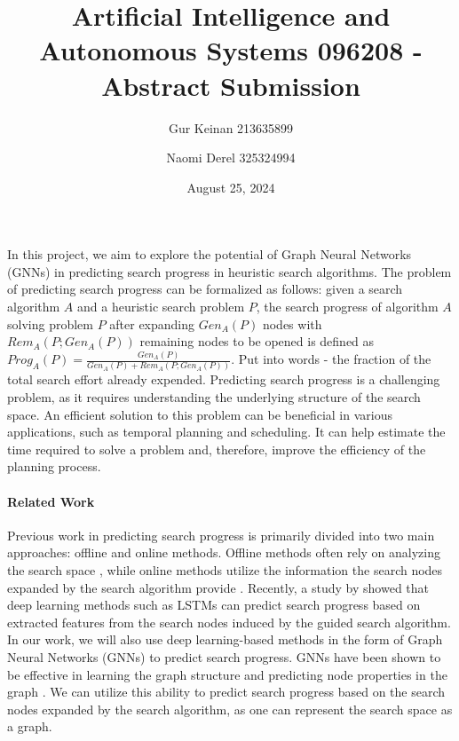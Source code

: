 \documentclass[12pt]{article}
\title{Artificial Intelligence and Autonomous Systems 096208 - Abstract Submission}
\author{Gur Keinan 213635899 \and Naomi Derel 325324994}
\date{August 25, 2024}
\begin{document}
\maketitle

In this project, we aim to explore the potential of Graph Neural Networks (GNNs) in predicting search progress in heuristic search algorithms. The problem of predicting search progress can be formalized as follows: given a search algorithm $A$ and a heuristic search problem $P$, the search progress of algorithm $A$ solving problem $P$ after expanding $Gen_A(P)$ nodes with $Rem_A(P; Gen_A(P))$ remaining nodes to be opened is defined as $Prog_A(P) = \frac{Gen_A(P)}{Gen_A(P) + Rem_A(P; Gen_A(P))}$. Put into words - the fraction of the total search effort already expended. Predicting search progress is a challenging problem, as it requires understanding the underlying structure of the search space.
An efficient solution to this problem can be beneficial in various applications, such as temporal planning and scheduling. It can help estimate the time required to solve a problem and, therefore, improve the efficiency of the planning process.

\paragraph{Related Work} Previous work in predicting search progress is primarily divided into two main approaches: offline and online methods. Offline methods often rely on analyzing the search space \citep{breyer2008recent}, while online methods utilize the information the search nodes expanded by the search algorithm provide \citep{thayer2012we}.
Recently, a study by \citet{sudry2022learning} showed that deep learning methods such as LSTMs can predict search progress based on extracted features from the search nodes induced by the guided search algorithm. In our work, we will also use deep learning-based methods in the form of Graph Neural Networks (GNNs) to predict search progress. GNNs have been shown to be effective in learning the graph structure and predicting node properties in the graph \citep{wu2020comprehensive, scarselli2008graph}. We can utilize this ability to predict search progress based on the search nodes expanded by the search algorithm, as one can represent the search space as a graph.
\end{document}
